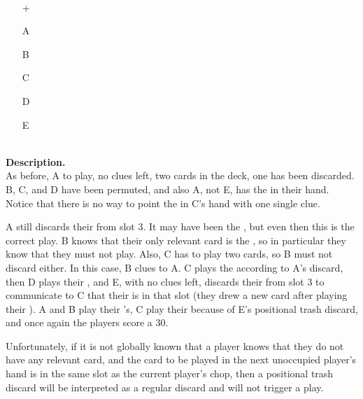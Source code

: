 \begin{example}	\hfill \\
	\begin{minipage}{0.45\textwidth}
		\begin{itemize}
			\item[\Large +]      
			\item[\Large A]    
			\item[\Large B]    
			\item[\Large C]    
			\item[\Large D]    
			\item[\Large E]    
		\end{itemize}
	\end{minipage}%
	\begin{minipage}{0.55\textwidth}
		\hfill \\
		
		\textbf{Description.} \\
		
		As before, A to play, no clues left, two cards in the deck, one  has been discarded. B, C, and D have been permuted, and also A, not E, has the  in their hand. Notice that there is no way to point the  in C's hand with one single clue.
			
		A still discards their  from slot 3. It may have been the , but even then this is the correct play. B knows that their only relevant card is the , so in particular they know that they must not play. Also, C has to play two cards, so B must not discard either. In this case, B clues  to A. C plays the  according to A's discard, then D plays their , and E, with no clues left, discards their  from slot 3 to communicate to C that their  is in that slot (they drew a new card after playing their ). A and B play their 's, C play their  because of E's positional trash discard, and once again the players score a 30.
	\end{minipage}
\end{example} \vspace{0.15 cm}

Unfortunately, if it is not globally known that a player knows that they do not have any relevant card, and the card to be played in the next unoccupied player's hand is in the same slot as the current player's chop, then a positional trash discard will be interpreted as a regular discard and will not trigger a play.

